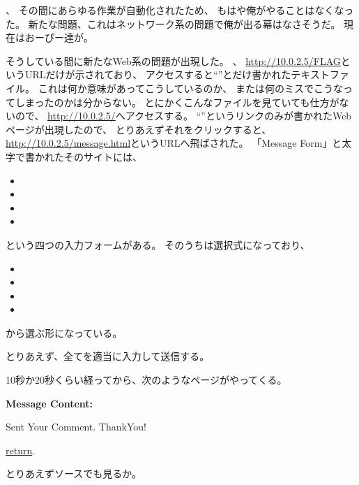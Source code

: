 、
その間にあらゆる作業が自動化されたため、
もはや俺がやることはなくなった。
新たな問題、これはネットワーク系の問題で俺が出る幕はなさそうだ。
現在はおーぴー達が。

そうしている間に新たなWeb系の問題が出現した。
、
\url{http://10.0.2.5/FLAG}というURLだけが示されており、
アクセスすると``''とだけ書かれたテキストファイル。
これは何か意味があってこうしているのか、
または何のミスでこうなってしまったのかは分からない。
とにかくこんなファイルを見ていても仕方がないので、
\url{http://10.0.2.5/}へアクセスする。
``''というリンクのみが書かれたWebページが出現したので、
とりあえずそれをクリックすると、\url{http://10.0.2.5/message.html}というURLへ飛ばされた。
「Message Form」と太字で書かれたそのサイトには、

\begin{itemize}
	\item {}
	\item {}
	\item {}
	\item {}
\end{itemize}

という四つの入力フォームがある。
そのうちは選択式になっており、

\begin{itemize}
	\item {}
	\item {}
	\item {}
	\item {}
\end{itemize}

から選ぶ形になっている。

とりあえず、全てを適当に入力して送信する。

10秒か20秒くらい経ってから、次のようなページがやってくる。

\begin{itembox}[c]{\textbf{Message Content:}}

Sent Your Comment. ThankYou!

\underline{return}. 
\end{itembox}

とりあえずソースでも見るか。



